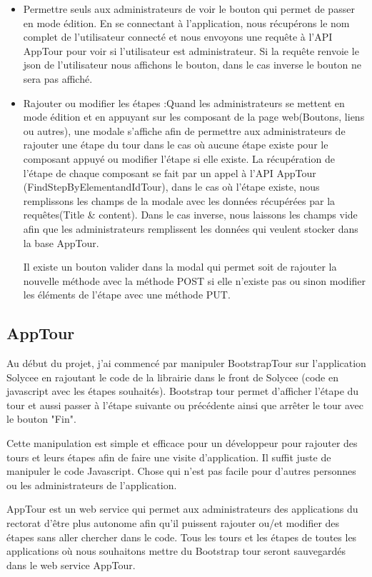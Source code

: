 \documentclass[12pt]{article}
\begin{document}
\begin{itemize}
\item Permettre seuls aux administrateurs de voir le bouton qui permet de passer en mode édition. En se connectant à l'application, nous récupérons le nom complet de l'utilisateur connecté et nous envoyons une requête à l'API AppTour pour voir si l'utilisateur est administrateur. Si la requête renvoie le json de l’utilisateur nous affichons le bouton, dans le cas inverse le bouton ne sera pas affiché. \newline 

\item Rajouter ou modifier les étapes :Quand les administrateurs se mettent en mode édition et en appuyant sur les composant de la page web(Boutons, liens ou autres), une modale s'affiche afin de permettre aux administrateurs de rajouter une étape du tour dans le cas où aucune étape existe pour le composant appuyé ou modifier l'étape si elle existe. 
La récupération de l'étape de chaque composant se fait par un appel à l'API AppTour (FindStepByElementandIdTour), dans le cas où l'étape existe, nous remplissons les champs de la modale avec les données récupérées par la requêtes(Title \& content). Dans le cas inverse, nous laissons les champs vide afin que les administrateurs remplissent les données qui veulent stocker dans la base AppTour.

Il existe un bouton valider dans la modal qui  permet soit de rajouter la nouvelle méthode avec la méthode POST si elle n'existe pas ou sinon modifier les éléments de l'étape avec une méthode PUT. 
\end{itemize}

\subsection{AppTour}   

Au début du projet, j'ai commencé par manipuler BootstrapTour sur l'application Solycee en rajoutant le code de la librairie dans le front de Solycee (code en javascript avec les étapes souhaités). Bootstrap tour permet d'afficher l'étape du tour et aussi passer à l'étape suivante ou précédente ainsi que arrêter le tour avec le bouton "Fin".

Cette manipulation est simple et efficace pour un développeur pour rajouter des tours et leurs étapes afin de faire une visite d'application. Il suffit juste de manipuler le code Javascript. Chose qui n'est pas facile pour d'autres personnes ou les administrateurs de l'application.

AppTour est un web service qui permet aux administrateurs des applications du rectorat d'être plus autonome afin qu'il puissent rajouter ou/et modifier des étapes sans aller chercher dans le code. Tous les tours et les étapes de toutes les applications où nous souhaitons mettre du Bootstrap tour seront sauvegardés dans le web service AppTour.   
\end{document}
